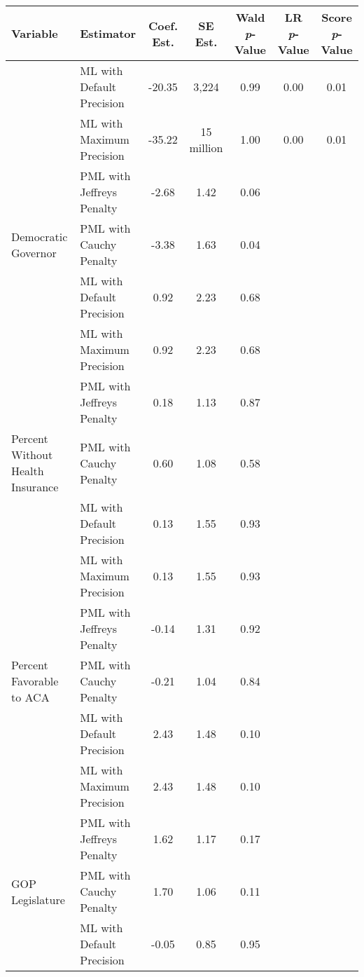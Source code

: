
\begin{tabular}{llccccc}
\toprule
Variable & Estimator & Coef. Est. & SE Est. & Wald \textit{p}-Value & LR \textit{p}-Value & Score \textit{p}-Value\\
\midrule
 & ML with Default Precision & -20.35 & 3,224 & 0.99 & 0.00 & 0.01\\

 & ML with Maximum Precision & -35.22 & 15 million & 1.00 & 0.00 & 0.01\\

 & PML with Jeffreys Penalty & -2.68 & 1.42 & 0.06 &  & \\

\multirow{-4}{*}{\raggedright\arraybackslash Democratic Governor} & PML with Cauchy Penalty & -3.38 & 1.63 & 0.04 &  & \\
\cmidrule{1-7}
 & ML with Default Precision & 0.92 & 2.23 & 0.68 &  & \\

 & ML with Maximum Precision & 0.92 & 2.23 & 0.68 &  & \\

 & PML with Jeffreys Penalty & 0.18 & 1.13 & 0.87 &  & \\

\multirow{-4}{*}{\raggedright\arraybackslash Percent Without Health Insurance} & PML with Cauchy Penalty & 0.60 & 1.08 & 0.58 &  & \\
\cmidrule{1-7}
 & ML with Default Precision & 0.13 & 1.55 & 0.93 &  & \\

 & ML with Maximum Precision & 0.13 & 1.55 & 0.93 &  & \\

 & PML with Jeffreys Penalty & -0.14 & 1.31 & 0.92 &  & \\

\multirow{-4}{*}{\raggedright\arraybackslash Percent Favorable to ACA} & PML with Cauchy Penalty & -0.21 & 1.04 & 0.84 &  & \\
\cmidrule{1-7}
 & ML with Default Precision & 2.43 & 1.48 & 0.10 &  & \\

 & ML with Maximum Precision & 2.43 & 1.48 & 0.10 &  & \\

 & PML with Jeffreys Penalty & 1.62 & 1.17 & 0.17 &  & \\

\multirow{-4}{*}{\raggedright\arraybackslash GOP Legislature} & PML with Cauchy Penalty & 1.70 & 1.06 & 0.11 &  & \\
\cmidrule{1-7}
 & ML with Default Precision & -0.05 & 0.85 & 0.95 &  & \\


\end{tabular}
